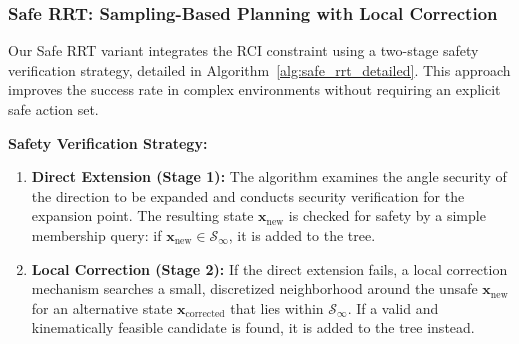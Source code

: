 \documentclass[conference]{IEEEtran}
\begin{document}
\subsubsection{Safe RRT: Sampling-Based Planning with Local Correction}
Our Safe RRT variant integrates the RCI constraint using a two-stage safety verification strategy, detailed in Algorithm~\ref{alg:safe_rrt_detailed}. This approach improves the success rate in complex environments without requiring an explicit safe action set.

\textbf{Safety Verification Strategy:}
\begin{enumerate}
    \item \textbf{Direct Extension (Stage 1):} The algorithm examines the angle security of the direction to be expanded and conducts security verification for the expansion point. The resulting state $\mathbf{x}_{\text{new}}$ is checked for safety by a simple membership query: if $\mathbf{x}_{\text{new}} \in \mathcal{S}_\infty$, it is added to the tree.
    \item \textbf{Local Correction (Stage 2):} If the direct extension fails, a local correction mechanism searches a small, discretized neighborhood around the unsafe $\mathbf{x}_{\text{new}}$ for an alternative state $\mathbf{x}_{\text{corrected}}$ that lies within $\mathcal{S}_\infty$. If a valid and kinematically feasible candidate is found, it is added to the tree instead.
\end{enumerate}
\end{document}
